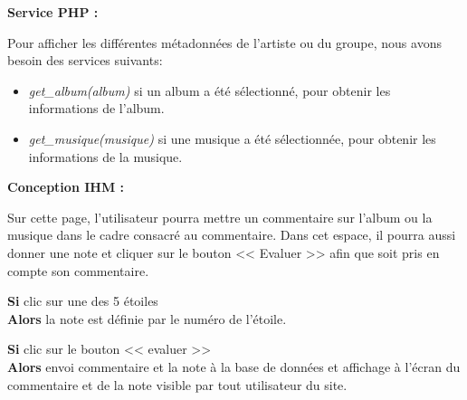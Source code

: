            \begin{paragraphe}
                \textbf{Service PHP :}
            \end{paragraphe}

            \begin{paragraphe}
                Pour afficher les différentes métadonnées de l'artiste ou du groupe, nous avons besoin des services suivants:
                \begin{itemize}
                        \item \emph{get\_album(album)} si un album a été sélectionné, pour obtenir les informations de l'album.
                        \item \emph{get\_musique(musique)} si une musique a été sélectionnée, pour obtenir les informations de la musique.
                \end{itemize}
            \end{paragraphe}

            \begin{paragraphe}
                \textbf{Conception IHM :}
            \end{paragraphe}

			\begin{paragraphe}
				Sur cette page, l'utilisateur pourra mettre un commentaire sur l'album ou la musique dans le cadre consacré au commentaire.
				Dans cet espace, il pourra aussi donner une note et cliquer sur le bouton << Evaluer >> afin que soit pris en compte son commentaire.
			\end{paragraphe}

			\begin{paragraphe}
				\textbf{Si} clic sur une des 5 étoiles \\
				\textbf{Alors} la note est définie par le numéro de l'étoile.
			\end{paragraphe}

			\begin{paragraphe}
				\textbf{Si} clic sur le bouton << evaluer >> \\
				\textbf{Alors} envoi commentaire et la note à la base de données et affichage à l'écran du commentaire et de la note visible par tout utilisateur du site.
			\end{paragraphe}


        \clearpage


